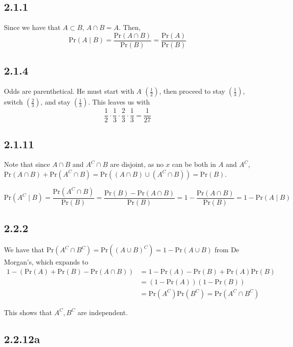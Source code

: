 \documentclass[12pt,letterpaper]{article}
\theoremstyle{definition}
\newcommand{\pr}[1]{\text{Pr}\left(#1\right)}
\begin{document}
\subsection*{2.1.1}

Since we have that $A \subset B$, $A \cap B = A$. Then,
\[
  \pr{A \mid B} = \frac{\pr{A \cap B}}{\pr{B}} = \frac{\pr{A}}{\pr{B}}
\]

\subsection*{2.1.4}

Odds are parenthetical. He must start with $A$ $(\frac{1}{2})$, then proceed to
stay $(\frac{1}{3})$, switch $(\frac{2}{3})$, and stay $(\frac{1}{3})$. This
leaves us with
\[
  \frac{1}{2} \cdot \frac{1}{3} \cdot \frac{2}{3} \cdot \frac{1}{3} = \frac{1}{27}
\]

\subsection*{2.1.11}

Note that since $A \cap B$ and $A^C \cap B$ are disjoint, as no $x$ can be both
in $A$ and $A^C$, $\pr{A \cap B} + \pr{A^C \cap B} = \pr{(A \cap B) \cup (A^C
  \cap B)} = \pr{B}$.

\[
  \pr{A^C \mid B} = \frac{\pr{A^C \cap B}}{\pr{B}} = \frac{\pr{B} - \pr{A \cap
    B}}{\pr{B}} = 1 - \frac{\pr{A \cap B}}{\pr{B}} = 1 - \pr{A \mid B}
\]

\subsection*{2.2.2}

We have that $\pr{A^C \cap B^C} = \pr{(A \cup B)^C} = 1 - \pr{A \cup B}$ from De
Morgan's, which expands to
\begin{align*}
  1 - (\pr{A} + \pr{B} - \pr{A \cap B}) &= 1 - \pr{A} - \pr{B} + \pr{A}\pr{B} \\
                                        &= (1 - \pr{A})(1 - \pr{B}) \\
                                        &= \pr{A^C}\pr{B^C} = \pr{A^C \cap B^C}
\end{align*}

This shows that $A^C, B^C$ are independent.

\subsection*{2.2.12a}
\end{document}
